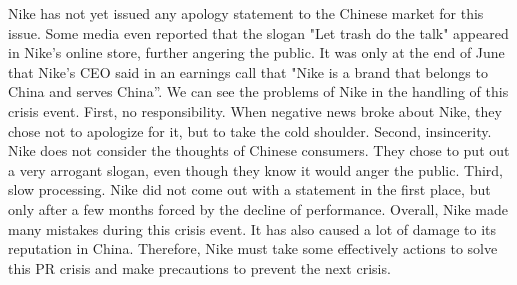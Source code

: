 \documentclass[a4paper, 12pt]{report}
\begin{document}
Nike has not yet issued any apology statement to the Chinese market for this issue. Some media even reported that the slogan "Let trash do the talk" appeared in Nike's online store, further angering the public. It was only at the end of June that Nike's CEO said in an earnings call that "Nike is a brand that belongs to China and serves China”. We can see the problems of Nike in the handling of this crisis event. First, no responsibility. When negative news broke about Nike, they chose not to apologize for it, but to take the cold shoulder. Second, insincerity. Nike does not consider the thoughts of Chinese consumers. They chose to put out a very arrogant slogan, even though they know it would anger the public. Third, slow processing. Nike did not come out with a statement in the first place, but only after a few months forced by the decline of performance. Overall, Nike made many mistakes during this crisis event. It has also caused a lot of damage to its reputation in China. Therefore, Nike must take some effectively actions to solve this PR crisis and make precautions to prevent the next crisis.
\end{document}
